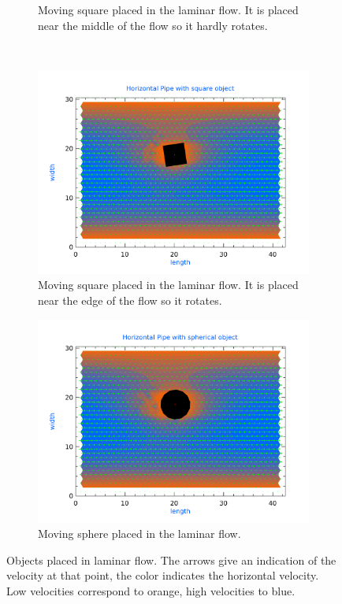\begin{figure}[htb]
\begin{subfigure}[b]{0.4\textwidth}
                \caption{Moving square placed in the laminar flow. It is placed near the middle of the flow so it hardly rotates.}
                \label{fig:rectangle}
        \end{subfigure}\\
            \begin{subfigure}[b]{0.4\textwidth}
            \centering
            \includegraphics[width=\textwidth]{plots/rotating_square.pdf}
            \caption{Moving square placed in the laminar flow. It is placed near the edge of the flow so it rotates.}
            \label{fig:rectangle}
    \end{subfigure}
\quad
    \begin{subfigure}[b]{0.4\textwidth}
            \centering
            \includegraphics[width=\textwidth]{plots/sphere.pdf}
            \caption{Moving sphere placed in the laminar flow.}
            \label{fig:rectangle}
    \end{subfigure}
        \caption{Objects placed in laminar flow. The arrows give an indication of the velocity at that point, the color indicates the horizontal velocity. Low velocities correspond to orange, high velocities to blue.}
        \label{fig:flow1}
\end{figure}
